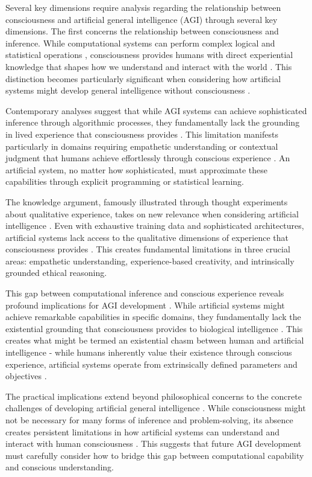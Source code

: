 \begin{refsection}
Several key dimensions require analysis regarding the relationship between consciousness and artificial general intelligence (AGI) through several key dimensions. The first concerns the relationship between consciousness and inference. While computational systems can perform complex logical and statistical operations \cite{Pearl2018}, consciousness provides humans with direct experiential knowledge that shapes how we understand and interact with the world \cite{ORegan2011}. This distinction becomes particularly significant when considering how artificial systems might develop general intelligence without consciousness \cite{Marcus2019}.

Contemporary analyses suggest that while AGI systems can achieve sophisticated inference through algorithmic processes, they fundamentally lack the grounding in lived experience that consciousness provides \cite{Dreyfus1992}. This limitation manifests particularly in domains requiring empathetic understanding or contextual judgment that humans achieve effortlessly through conscious experience \cite{Lake2017}. An artificial system, no matter how sophisticated, must approximate these capabilities through explicit programming or statistical learning.

The knowledge argument, famously illustrated through thought experiments about qualitative experience, takes on new relevance when considering artificial intelligence \cite{Searle2004}. Even with exhaustive training data and sophisticated architectures, artificial systems lack access to the qualitative dimensions of experience that consciousness provides \cite{Hoffman2019}. This creates fundamental limitations in three crucial areas: empathetic understanding, experience-based creativity, and intrinsically grounded ethical reasoning.

This gap between computational inference and conscious experience reveals profound implications for AGI development \cite{Bostrom2014}. While artificial systems might achieve remarkable capabilities in specific domains, they fundamentally lack the existential grounding that consciousness provides to biological intelligence \cite{Dennett2017}. This creates what might be termed an existential chasm between human and artificial intelligence - while humans inherently value their existence through conscious experience, artificial systems operate from extrinsically defined parameters and objectives \cite{Mitchell2019}.

The practical implications extend beyond philosophical concerns to the concrete challenges of developing artificial general intelligence \cite{Goertzel2007}. While consciousness might not be necessary for many forms of inference and problem-solving, its absence creates persistent limitations in how artificial systems can understand and interact with human consciousness \cite{Tegmark2017}. This suggests that future AGI development must carefully consider how to bridge this gap between computational capability and conscious understanding.


\end{refsection}
